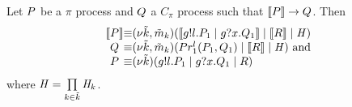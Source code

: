 \begin{lemma}\label{lem:first_reduction_of_encoded_processes}
Let $P$ be a $\pi$ process and $Q$ a $C_\pi$ process such that $\llbracket P \rrbracket\rightarrow Q$. Then 
\[
\begin{array}{@{}c@{}c@{}l@{}}
\enc{\PP} & \equiv & \rest{\tilde{\NK}, \tilde{\NM}_\NK}(\enc{\send\NGG\role\msg\NL.\PP_1\parop \receive\NGG\role\msg\NX.\PQ_1} \parop \enc{\PR} \parop \handler)\\
\PQ & \equiv & \rest{\tilde{\NK}, \tilde{\NM}_\NK}(\Proc_1^\NL(\PP_1,\PQ_1) \parop \enc{\PR} \parop \handler)  \text{ and }\\
\PP & \equiv & \rest{\tilde{\NK}}(\send\NGG\role\msg\NL.\PP_1\parop \receive\NGG\role\msg\NX.\PQ_1 \parop \PR) \\
\end{array}
 \]
where $\mathit{H}=\prod\limits_{k\in\tilde{k}}\mathit{H}_k$.
\end{lemma}
